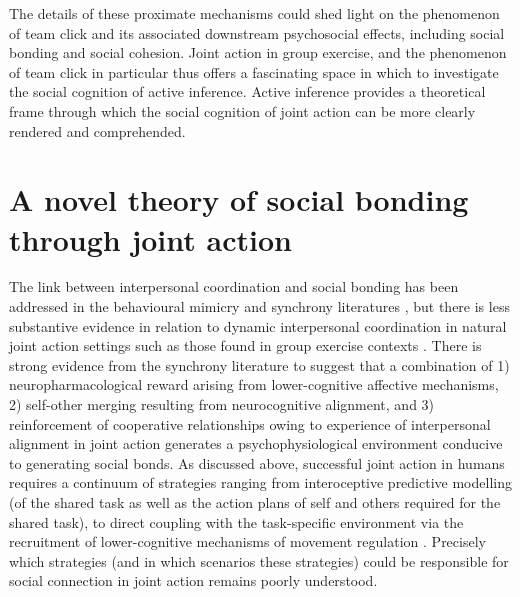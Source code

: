\begin{CJK}{UTF8}{gbsn}
The details of these proximate mechanisms could shed light on the phenomenon of team click and its associated downstream psychosocial effects, including social bonding and social cohesion.  Joint action in group exercise, and the phenomenon of team click in particular thus offers a fascinating space in which to investigate the social cognition of active inference.  Active inference provides a theoretical frame through which the social cognition of joint action can be more clearly rendered and comprehended.




























\section{A novel theory of social bonding through joint action\label{sect:novelTheory}}

The link between interpersonal coordination and social bonding has been addressed in the behavioural mimicry and synchrony literatures \citep[e.g.,][]{Wheatley2012,Launay2016,Mogan2017}, but there is less substantive evidence in relation to dynamic interpersonal coordination in natural joint action settings such as those found in group exercise contexts \citep{Marsh2009,Miles2009,Lumsden2012}.  There is strong evidence from the synchrony literature to suggest that a combination of 1) neuropharmacological reward arising from lower-cognitive affective mechanisms, 2) self-other merging resulting from neurocognitive alignment, and 3) reinforcement of cooperative relationships owing to experience of interpersonal alignment in joint action generates a psychophysiological environment conducive to generating social bonds.  As discussed above, successful joint action in humans requires a continuum of strategies ranging from interoceptive predictive modelling (of the shared task as well as the action plans of self and others required for the shared task), to direct coupling with the task-specific environment via the recruitment of lower-cognitive mechanisms of movement regulation \citep[e.g., proprioceptive mechanisms of balance and orientation][]{Semin2008} .  Precisely which strategies (and in which scenarios these strategies) could be responsible for social connection in joint action remains poorly understood.


\end{CJK}
